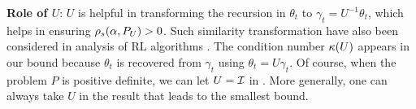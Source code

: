 \textbf{Role of $U$}: $U$ is helpful in transforming the recursion in $\theta_t$ to $\gamma_t=U^{-1}\theta_t$, which helps in ensuring $\rho_s(\alpha,P_U)>0$. Such similarity transformation have also been considered in analysis of RL algorithms \cite{lihong}. The condition number $\kappa(U)$ appears in our bound because $\theta_t$ is recovered from $\gamma_t$ using
$\theta_t=U\gamma_t$. Of course, when the problem $P$ is positive definite, we can let $U=\mathcal{I}$ in .
More generally, one can always take $U$ in the result that leads to the smallest bound.
\begin{comment}
\textbf{Role of $U$}: When the given problem $P$ is positive definite, it is straightforward to produce an $\alpha_P>0$ such that $\rhos{P}>0$ and $\rhod{P}>0,\,\forall \alpha\in(0,\alpha_P)$ by considering the definitions of $\rhos{P}$ and $\rhod{P}$.
However, the problem $P$ being Hurwitz does not guarantee positive definiteness. %
\todoc{I commented out the examples.}
Following  \cite{lihong}, we remedy this 
by applying a similarity transformation using an appropriate $U$ that transforms a Hurwitz problem $P$ to a positive definite problem $P_U$. This can be done because any Hurwitz matrix is similar to a PD matrix. 
Taking $U$ to be this similarity matrix, we transform  \eqref{conststep} by premultiplying it by $U^{-1}$ and introducing a new variable $\gamma_t\eqdef U^{-1 }\theta_t$.
\if0
To see how this works, let $\gamma_t\eqdef U^{-1 }\theta_t$. Premultiplying 
 \eqref{conststep} by $U^{-1}$ and plugging in $\gamma_t$, we get
\begin{align*}
\gamma_t&=\gamma_{t-1}+\alpha(U^{-1} b_t- J_t\gamma_{t-1}),
\end{align*}
where $J_t = U^{-1}A_t U$.
Now, since any Hurwitz matrix is similar to a PD matrix with an appropriate similarity transformation $U$, choosing $U$ this way we get that $\E[J_t]$ is PD, hence $P_U$ is PD.
\fi
The condition number $\cond{U}$ appears in our bound because $\theta_t$ is recovered from $\gamma_t$ using
$\theta_t=U\gamma_t$. Of course, when the problem $P$ is positive definite, we can let $U=\I$ in \Cref{th:rate}. 
More generally, one can always take $U$ in the result that leads to the smallest bound.
\end{comment}

